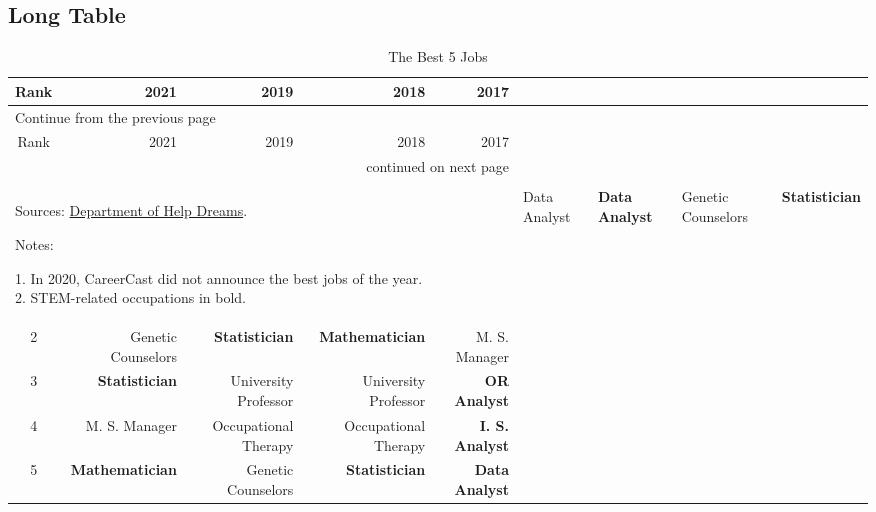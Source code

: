 \documentclass[utf8,12pt]{article} %
\begin{document}
\subsection{Long Table}
%
%
\begin{longtable}{@{}crrrr@{}}
\caption{The Best 5 Jobs}\label{CareerCast}\\
\toprule
\midrule
Rank & 2021 &  2019 & 2018 & 2017 \\ %
\midrule
\endfirsthead %
%
\multicolumn{5}{l}{Continue from the previous page}\\[2pt] %
\toprule
\midrule
Rank & 2021 &  2019 & 2018 & 2017 \\ %
\midrule
\endhead %
%
\midrule
\bottomrule
\multicolumn{5}{r}{continued on next page}\\[2pt] %
\endfoot\\[-10pt]  %
\multicolumn{5}{l}{\parbox{\textwidth}{\footnotesize %
Sources: \href{https://helpdreams.moe.edu.tw/hd/upload/20201211_1.pdf}{Department of Help Dreams}.\par\smallskip
Notes: \parbox[t]{0.95\textwidth}{\footnotesize %
1. In 2020, CareerCast did not announce the best jobs of the year.\\
2. STEM-related occupations in bold.
}
}
}
\endlastfoot
1 & {Data Analyst} & \textbf{Data Analyst}  &  Genetic Counselors & \textbf{Statistician} \\
2 & Genetic Counselors & \textbf{Statistician} & \textbf{Mathematician}  & M. S. Manager \\
3 & \textbf{Statistician} & University Professor  & University Professor & \textbf{OR Analyst}\\
4 &M. S. Manager & Occupational Therapy  & Occupational Therapy & \textbf{I. S. Analyst} \\
5 & \textbf{Mathematician} & Genetic Counselors & \textbf{Statistician} & \textbf{Data Analyst} \\

\end{longtable}
\end{document}
